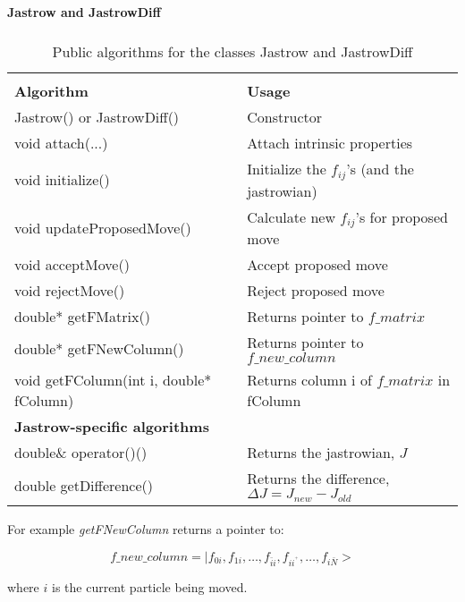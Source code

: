 \begin{table}[hbtp]
\begin{center} {\large \bf Jastrow and JastrowDiff} \\ 
$\phantom{a}$ \\
\begin{tabular}{ll}
\hline\\ 
{\bf Algorithm}                        & {\bf Usage} \\
Jastrow() or JastrowDiff()             &  Constructor\\
void attach(...)                       &  Attach intrinsic properties\\
void initialize()                      &  Initialize the $f_{ij}$'s (and the jastrowian)\\
void updateProposedMove()              &Calculate new $f_{ij}$'s for proposed move\\
void acceptMove()                      &Accept proposed move\\
void rejectMove()                      &Reject proposed move\\
double* getFMatrix()                   &Returns pointer to $f\_matrix$\\
double* getFNewColumn()                &Returns pointer to $f\_new\_column$\\
void getFColumn(int i, double* fColumn)&Returns column i of $f\_matrix$ in fColumn\\
{\bf Jastrow-specific algorithms}      &\\
double\& operator()()                  &Returns the jastrowian, $J$\\
double getDifference()                 &Returns the difference, $\Delta J=J_{new}-J_{old}$\\
\hline
\end{tabular} 
 \end{center}
  \caption{Public algorithms for the classes Jastrow and JastrowDiff}
\label{Jastrow}
\end{table}

For example \emph{getFNewColumn} returns a pointer to:

\begin{equation}
  f\_new\_column = | f_{0i}, f_{1i}, \dots, f_{\bar{i}i}, f_{ii^{^+}},
  \dots, f_{i \bar{N}} >
\end{equation}

where $i$ is the current particle being moved.





